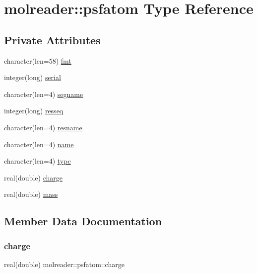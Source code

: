 \hypertarget{structmolreader_1_1psfatom}{}\section{molreader\+:\+:psfatom Type Reference}
\label{structmolreader_1_1psfatom}
\subsection*{Private Attributes}
\begin{DoxyCompactItemize}
\item 
character(len=58) \hyperlink{structmolreader_1_1psfatom_a2c662eb006fdf85c624b28a08f65cc7b}{fmt}
\item 
integer(long) \hyperlink{structmolreader_1_1psfatom_ab524e29eb9ad1beb802719121a639fa0}{serial}
\item 
character(len=4) \hyperlink{structmolreader_1_1psfatom_aed960b86c5ddd5378e5a849a2732f650}{segname}
\item 
integer(long) \hyperlink{structmolreader_1_1psfatom_abb34c7f3cc664d0e63be1fc695413f7a}{resseq}
\item 
character(len=4) \hyperlink{structmolreader_1_1psfatom_a0bd7d6afb5d4c41d84a1e278d341ec00}{resname}
\item 
character(len=4) \hyperlink{structmolreader_1_1psfatom_a5f7ded307db07f842d21aee2dfca772b}{name}
\item 
character(len=4) \hyperlink{structmolreader_1_1psfatom_a99d2104c1a01026eef2cd329fd546f90}{type}
\item 
real(double) \hyperlink{structmolreader_1_1psfatom_abbebc3b397af2ee56c04933bc3008753}{charge}
\item 
real(double) \hyperlink{structmolreader_1_1psfatom_ae3774dcb1dec79eb1f7d5e26331056bb}{mass}
\end{DoxyCompactItemize}


\subsection{Member Data Documentation}
\mbox{\label{structmolreader_1_1psfatom_abbebc3b397af2ee56c04933bc3008753}} 
\subsubsection{\texorpdfstring{charge}{charge}}
{\footnotesize\ttfamily real(double) molreader\+::psfatom\+::charge\hspace{0.3cm}{\ttfamily [private]}}


